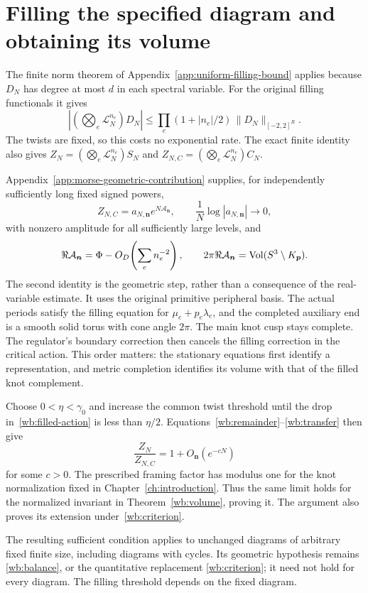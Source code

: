 \section{Filling the specified diagram and obtaining its volume}

The finite norm theorem of Appendix~\ref{app:uniform-filling-bound}
applies because $D_N$ has degree at most $d$ in each spectral variable.
For the original filling functionals it gives
\begin{equation}\label{wb:transfer}
 \left|\left(\bigotimes_e\mathcal L_N^{n_e}\right)D_N\right|
       \le\prod_e(1+|n_e|/2)\,\|D_N\|_{[-2,2]^R}.
\end{equation}
The twists are fixed, so this costs no exponential rate. The exact
finite identity also gives
$Z_N=(\bigotimes_e\mathcal L_N^{n_e})S_N$ and
$Z_{N,C}=(\bigotimes_e\mathcal L_N^{n_e})C_N$.

Appendix~\ref{app:morse-geometric-contribution} supplies, for
independently sufficiently long fixed signed powers,
\[
 Z_{N,C}=a_{N,\boldsymbol n}e^{N\mathcal A_{\boldsymbol n}},
 \qquad \frac1N\log|a_{N,\boldsymbol n}|\longrightarrow0,
\]
with nonzero amplitude for all sufficiently large levels, and
\begin{equation}\label{wb:filled-action}
 \Re\mathcal A_{\boldsymbol n}
   =\Phi-O_D\!\left(\sum_en_e^{-2}\right),\qquad
 2\pi\Re\mathcal A_{\boldsymbol n}
   =\operatorname{Vol}(S^3\setminus K_{\boldsymbol p}).
\end{equation}
The second identity is the geometric step, rather than a consequence
of the real-variable estimate. It uses the original primitive peripheral basis.
The actual periods satisfy the filling equation for
$\mu_e+p_e\lambda_e$, and the completed auxiliary end is a smooth
solid torus with cone angle $2\pi$. The main knot cusp stays complete.
The regulator's boundary correction then cancels the filling correction
in the critical action. This order matters: the stationary equations
first identify a representation, and metric completion identifies its
volume with that of the filled knot complement.

Choose $0<\eta<\gamma_0$ and increase the common twist threshold
until the drop in~\eqref{wb:filled-action} is less than $\eta/2$.
Equations~\eqref{wb:remainder}--\eqref{wb:transfer} then give
\[
 \frac{Z_N}{Z_{N,C}}=1+O_{\boldsymbol n}(e^{-cN})
\]
for some $c>0$. The prescribed framing factor has modulus one for the knot
normalization fixed in Chapter~\ref{ch:introduction}. Thus the same limit holds for the normalized invariant in
Theorem~\ref{wb:volume}, proving it. The argument also proves its
extension under~\eqref{wb:criterion}.

The resulting sufficient condition applies to unchanged diagrams of
arbitrary fixed finite size, including diagrams with cycles. Its
geometric hypothesis remains \eqref{wb:balance}, or the quantitative
replacement \eqref{wb:criterion}; it need not hold for every diagram.
The filling threshold depends on the fixed diagram.
